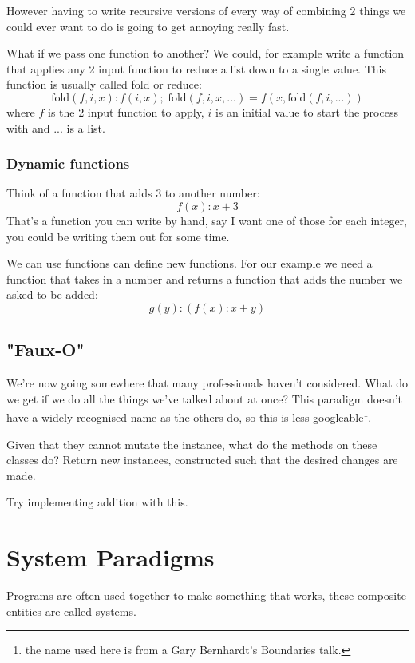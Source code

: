 \documentclass{article}
\begin{document}
However having to write recursive versions of every way of combining 2 things
we could ever want to do is going to get annoying really fast.

What if we pass one function to another?
We could, for example write a function that applies any 2 input function to
reduce a list down to a single value.
This function is usually called fold or reduce:
\begin{displaymath}
\mathrm{fold}(f, i, x): f(i, x) ;\; \mathrm{fold}(f, i, x, ...) = f(x, \mathrm{fold}(f, i, ...))
\end{displaymath}
where $f$ is the 2 input function to apply, $i$ is an initial value to start
the process with and $...$ is a list.

\subsubsection{Dynamic functions}
Think of a function that adds 3 to another number:
\begin{displaymath}
f(x): x + 3
\end{displaymath}
That's a function you can write by hand, say I want one of those for each
integer, you could be writing them out for some time.

We can use functions can define new functions.
For our example we need a function that takes in a number and returns a
function that adds the number we asked to be added:
\begin{displaymath}
g(y): (f(x): x + y)
\end{displaymath}

\subsection{"Faux-O"}
We're now going somewhere that many professionals haven't considered.
What do we get if we do all the things we've talked about at once?
This paradigm doesn't have a widely recognised name as the others do, so this
is less googleable\footnote{the name used here is from a Gary Bernhardt's
Boundaries talk.}.

Given that they cannot mutate the instance, what do the methods on these
classes do?
Return new instances, constructed such that the desired changes are made.

Try implementing addition with this.

\section{System Paradigms}
Programs are often used together to make something that works, these composite
entities are called systems.
\end{document}
